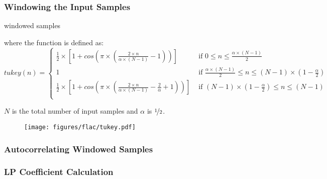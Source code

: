 \subsubsection{Windowing the Input Samples}
{
\Return windowed samples\;
\EALGORITHM
\par
\noindent
where the  function is defined as:
\begin{equation*}
tukey(n) =
\begin{cases}
\frac{1}{2} \times \left[1 + cos\left(\pi \times \left(\frac{2 \times n}{\alpha \times (N - 1)} - 1 \right)\right)\right] & \text{ if } 0 \leq n \leq \frac{\alpha \times (N - 1)}{2} \\
1 & \text{ if } \frac{\alpha \times (N - 1)}{2} \leq n \leq (N - 1) \times (1 - \frac{\alpha}{2}) \\
\frac{1}{2} \times \left[1 + cos\left(\pi \times \left(\frac{2 \times n}{\alpha \times (N - 1)} - \frac{2}{\alpha} + 1 \right)\right)\right] & \text{ if } (N - 1) \times (1 - \frac{\alpha}{2}) \leq n \leq (N - 1) \\
\end{cases}
\end{equation*}
\par
\noindent
$N$ is the total number of input samples and $\alpha$ is $\nicefrac{1}{2}$.
}

\begin{figure}[h]
\texttt{[image: figures/flac/tukey.pdf]}
\end{figure}



\clearpage

\subsubsection{Autocorrelating Windowed Samples}
\EALGORITHM

\subsubsection{LP Coefficient Calculation}

